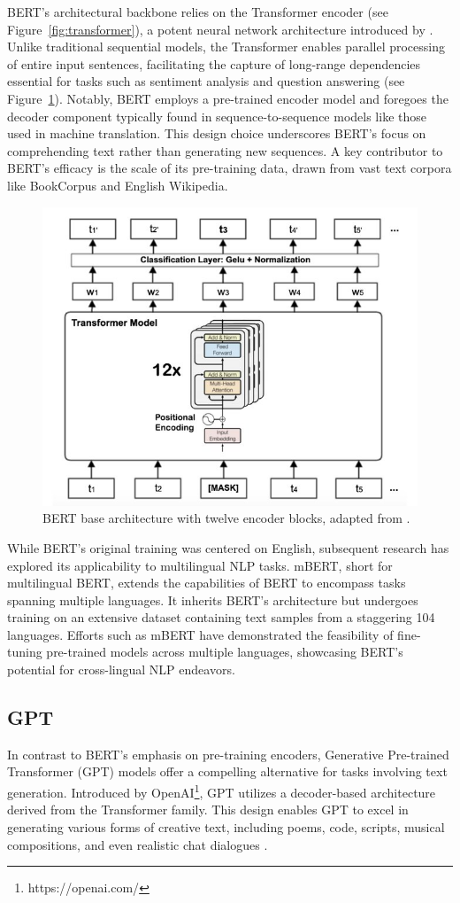 BERT's architectural backbone relies on the Transformer encoder (see Figure~\ref{fig:transformer}), a potent neural network architecture introduced by \cite{vaswani17}. 
Unlike traditional sequential models, the Transformer enables parallel processing of entire input sentences, facilitating the capture of long-range dependencies essential for tasks such as sentiment analysis and question answering (see Figure~\ref{fig:bert}). 
Notably, BERT employs a pre-trained encoder model and foregoes the decoder component typically found in sequence-to-sequence models like those used in machine translation. 
This design choice underscores BERT's focus on comprehending text rather than generating new sequences. A key contributor to BERT's efficacy is the scale of its pre-training data, drawn from vast text corpora like BookCorpus and English Wikipedia. 
\begin{figure}
	\centering
	\includegraphics[width=0.7\linewidth]{Figures/BERT}
	\caption{BERT base architecture with twelve encoder blocks, adapted from \cite{khalid21}.}
	\label{fig:bert}
\end{figure}

While BERT's original training was centered on English, subsequent research has explored its applicability to multilingual NLP tasks. 
mBERT, short for multilingual BERT, extends the capabilities of BERT to encompass tasks spanning multiple languages. It inherits BERT's architecture but undergoes training on an extensive dataset containing text samples from a staggering 104 languages.
Efforts such as mBERT have demonstrated the feasibility of fine-tuning pre-trained models across multiple languages, showcasing BERT's potential for cross-lingual NLP endeavors\cite{pires19}.

\subsection{GPT}
In contrast to BERT's emphasis on pre-training encoders, Generative Pre-trained Transformer (GPT) models offer a compelling alternative for tasks involving text generation. 
Introduced by OpenAI\footnote{https://openai.com/}, GPT utilizes a decoder-based architecture derived from the Transformer family. 
This design enables GPT to excel in generating various forms of creative text, including poems, code, scripts, musical compositions, and even realistic chat dialogues \cite{radford18}.

